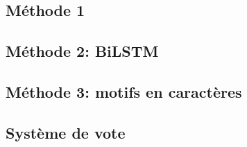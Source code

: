 
\subsection{Méthode 1}

\subsection{Méthode 2: BiLSTM}

\subsection{Méthode 3: motifs en caractères}

\subsection{Système de vote}

